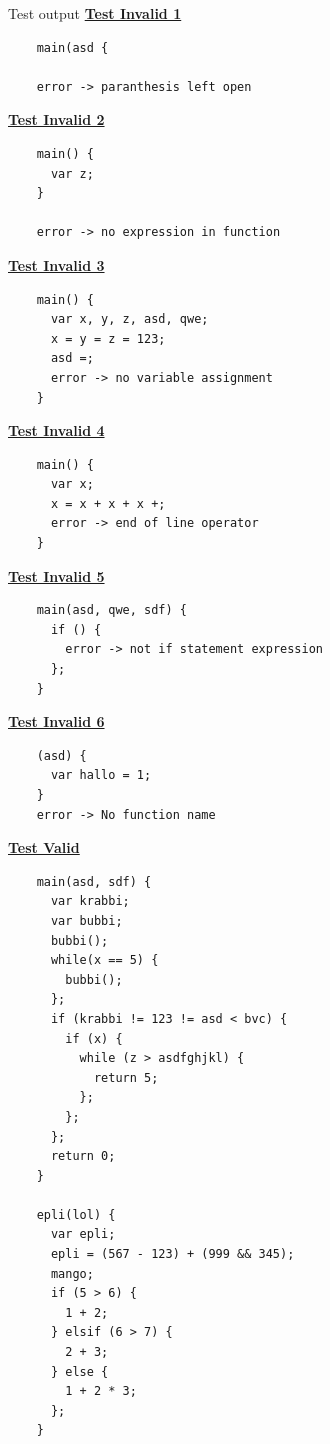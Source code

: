 \documentclass{homework}
\begin{document}
\begin{question}{Test output}
  \textbf{\underline{Test Invalid 1}}
  \begin{verbatim}
    main(asd {

    error -> paranthesis left open
  \end{verbatim}
  \textbf{\underline{Test Invalid 2}}
  \begin{verbatim}
    main() {
      var z;
    }

    error -> no expression in function
  \end{verbatim}
  \textbf{\underline{Test Invalid 3}}
  \begin{verbatim}
    main() {
      var x, y, z, asd, qwe;
      x = y = z = 123;
      asd =;
      error -> no variable assignment
    }
  \end{verbatim}
  \textbf{\underline{Test Invalid 4}}
  \begin{verbatim}
    main() {
      var x;
      x = x + x + x +;
      error -> end of line operator
    }
  \end{verbatim}
  \textbf{\underline{Test Invalid 5}}
  \begin{verbatim}
    main(asd, qwe, sdf) {
      if () {
        error -> not if statement expression
      };
    }
  \end{verbatim}
  \textbf{\underline{Test Invalid 6}}
  \begin{verbatim}
    (asd) {
      var hallo = 1;
    }
    error -> No function name
  \end{verbatim}
  \textbf{\underline{Test Valid}}
  \begin{verbatim}
    main(asd, sdf) {
      var krabbi;
      var bubbi;
      bubbi();
      while(x == 5) {
        bubbi();
      };
      if (krabbi != 123 != asd < bvc) {
        if (x) {
          while (z > asdfghjkl) {
            return 5;
          };
        };
      };
      return 0;
    }
    
    epli(lol) {
      var epli;
      epli = (567 - 123) + (999 && 345);
      mango;
      if (5 > 6) {
        1 + 2;
      } elsif (6 > 7) {
        2 + 3;
      } else {
        1 + 2 * 3;
      };
    }    
  \end{verbatim}
\end{question}
\end{document}
